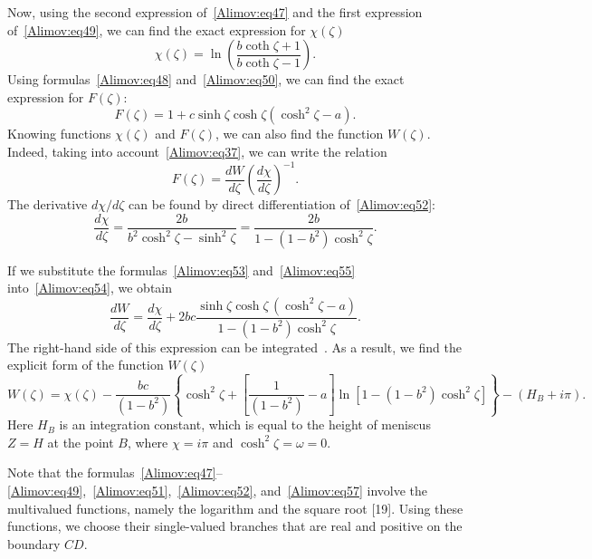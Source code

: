 \documentclass[
11pt,%
tightenlines,%
twoside,%
onecolumn,%
nofloats,%
nobibnotes,%
nofootinbib,%
superscriptaddress,%
noshowpacs,%
centertags]%
{revtex4-2}
\begin{document}
Now, using the second expression of~\eqref{Alimov:eq47} and the first expression
of~\eqref{Alimov:eq49}, we can find the exact expression for $\chi(\zeta)$
\begin{equation}
\label{Alimov:eq52} \chi (\zeta) = \ln \left( {\frac{b\coth \zeta + 1}{b\coth \zeta - 1}} \right).
\end{equation}
Using formulas~\eqref{Alimov:eq48} and~\eqref{Alimov:eq50}, we can find the exact expression for
$F(\zeta ):$
\begin{equation}
\label{Alimov:eq53} F(\zeta) = 1 + c\sinh \zeta \cosh \zeta \left( {\cosh^2\zeta - a} \right).
\end{equation}
Knowing functions $\chi (\zeta)$ and $F(\zeta)$, we can also find the function $W(\zeta)$. Indeed,
taking into account~\eqref{Alimov:eq37}, we can write the relation
\begin{equation}
\label{Alimov:eq54} F(\zeta) = \frac{dW}{d\zeta} \left( \frac{d\chi}{d\zeta} \right)^{-1}.
\end{equation}
The derivative ${d\chi / d\zeta}$ can be found by direct differentiation of~\eqref{Alimov:eq52}:
\begin{equation}
\label{Alimov:eq55} \frac{d\chi}{d\zeta} = \frac{2b}{b^2 \cosh^2 \zeta - \sinh^2\zeta } =
\frac{2b}{1 - (1 - b^2) \cosh^2\zeta} .
\end{equation}

If we substitute the formulas~\eqref{Alimov:eq53} and~\eqref{Alimov:eq55} into~\eqref{Alimov:eq54},
we obtain
\begin{equation}
\label{Alimov:eq56} \frac{dW}{d\zeta} = \frac{d\chi}{d\zeta} + 2bc \frac{\sinh \zeta \cosh \zeta
\,(\cosh^2\zeta - a)} {1 - (1 - b^2) \cosh^2\zeta}.
\end{equation}
The right-hand side of this expression can be integrated~\cite{Alimov:bib22}. As a result, we find
the explicit form of the function $W(\zeta)$
\begin{equation}
\label{Alimov:eq57} W(\zeta) = \chi (\zeta) - \frac{bc}{(1 - b^2)}\left\{ {\cosh^2\zeta + \left[
{\frac{1}{(1-b^2)} - a} \right] \ln \left[ {1 - (1-b^2)\cosh^2\zeta} \right]} \right\} - (H_B +
i\pi).
\end{equation}
Here $H_B $ is an integration constant, which is equal to the height of meniscus $Z = H$ at the
point $B$, where $\chi = i\pi$ and $\cosh^2\zeta = \omega = 0$.

Note that the
formulas~\eqref{Alimov:eq47}--\eqref{Alimov:eq49},~\eqref{Alimov:eq51},~\eqref{Alimov:eq52},
and~\eqref{Alimov:eq57} involve the multivalued functions, namely the logarithm and the square root
[19]. Using these functions, we choose their single-valued branches that are real and positive on
the boundary $CD$.
\end{document}
